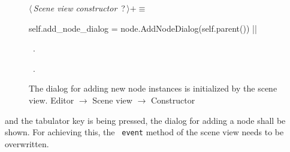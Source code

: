 \documentclass[%
    a4paper,    %
    justified,  %
    nobib,      %
    openany     %
]{tufte-book}
\makeatletter
\renewcommand{\label}[1]{\@tufte@label{##1}}%
\makeatother
\begin{document}
\begin{figure}
\begin{flushleft} \small
\begin{minipage}{\linewidth}\label{scrap150}\raggedright\small
{} $\langle\,${\itshape Scene view constructor}\nobreak\ {\footnotesize {?}}$\,\rangle+\equiv$
\vspace{-1ex}
\begin{pythoncode}
    self.add_node_dialog = node.AddNodeDialog(self.parent())
|\NWsep|
\end{pythoncode}
\vspace{1.5ex}
\footnotesize
\begin{list}{}{\setlength{\itemsep}{-\parsep}\setlength{\itemindent}{-\leftmargin}}
\item \NWtxtMacroDefBy\ .
\item \NWtxtMacroRefIn\ .

\item{}
\end{list}
\end{minipage}\vspace{4ex}
\end{flushleft}
\caption{The dialog for adding new node instances is initialized by the scene
  view.
  \newline{}\newline{}Editor $\rightarrow$ Scene view $\rightarrow$ Constructor}
\label{editor:lst:scene-view:constructor:add-node-dialog}
\end{figure}

 and the tabulator key is being
pressed, the dialog for adding a node shall be shown. For achieving this, the
~\verb=event= method of the scene view needs to be overwritten.
\end{document}

